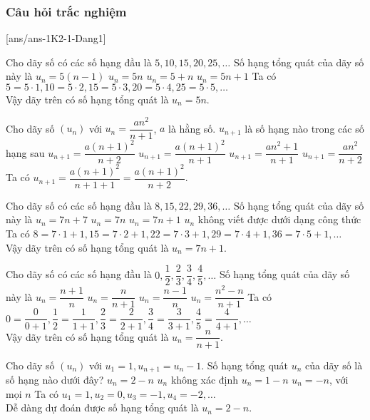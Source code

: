 \subsubsection{Câu hỏi trắc nghiệm}
[ans/ans-1K2-1-Dang1]
\begin{ex}%
	Cho dãy số có các số hạng đầu là $5,10,15,20,25, \ldots$ Số hạng tổng quát của dãy số này là
	\choice
	{$ u_n=5(n-1) $}
	{\True$ u_n=5n $}
	{$ u_n=5+n $}
	{$ u_n=5n+1 $}
	\loigiai
	{Ta có $5=5\cdot 1, 10=5 \cdot 2, 15 = 5\cdot 3, 20=5 \cdot 4, 25 = 5\cdot 5, \ldots$\\
		Vậy dãy trên có số hạng tổng quát là $u_n=5n$.
	}
\end{ex}
\begin{ex}%
	Cho dãy số $(u_n)$ với $u_n=\dfrac{an^2}{n+1}$, $a$ là hằng số. $u_{n+1}$ là số hạng nào trong các số hạng sau
	\choice
	{\True $u_{n+1}=\dfrac{a(n+1)^2}{n+2} $}
	{$u_{n+1}=\dfrac{a(n+1)^2}{n+1}$}
	{$u_{n+1}=\dfrac{an^2+1}{n+1}$}
	{$u_{n+1}=\dfrac{an^2}{n+2} $}
	\loigiai
	{Ta có $u_{n+1}=\dfrac{a(n+1)^2}{n+1+1}=\dfrac{a(n+1)^2}{n+2}$.
	}
\end{ex}
\begin{ex}%
	Cho dãy số có các số hạng đầu là $8,15,22,29,36, \ldots$ Số hạng tổng quát của dãy số này là
	\choice
	{$ u_n=7n+7 $}
	{$ u_n=7n $}
	{\True $ u_n=7n+1 $}
	{$ u_n$ không viết được dưới dạng công thức }
	\loigiai
	{Ta có $8=7\cdot 1+1, 15=7 \cdot 2+1, 22 = 7\cdot 3+1, 29=7 \cdot 4+1, 36 = 7\cdot 5+1, \ldots$\\
		Vậy dãy trên có số hạng tổng quát là $u_n=7n+1$.
	}
\end{ex}
\begin{ex}%
	Cho dãy số có các số hạng đầu là $0,\dfrac{1}{2},\dfrac{2}{3},\dfrac{3}{4},\dfrac{4}{5}, \ldots$ Số hạng tổng quát của dãy số này là
	\choice
	{$ u_n=\dfrac{n+1}{n}$}
	{\True $ u_n=\dfrac{n}{n+1} $}
	{$ u_n=\dfrac{n-1}{n}$}
	{$ u_n=\dfrac{n^2-n}{n+1}$  }
	\loigiai
	{Ta có $0=\dfrac{0}{0+1}, \dfrac{1}{2}=\dfrac{1}{1+1} ,\dfrac{2}{3} = \dfrac{2}{2+1}, \dfrac{3}{4}=\dfrac{3}{3+1}, \dfrac{4}{5} = \dfrac{4}{4+1}, \ldots$\\
		Vậy dãy trên có số hạng tổng quát là $u_n=\dfrac{n}{n+1}$.
	}
\end{ex}
\begin{ex}%
	Cho dãy số $(u_n)$ với $u_1=1, u_{n+1}=u_n-1$. Số hạng tổng quát $u_n$ của dãy số là số hạng nào dưới đây?
	\choice
	{\True $ u_n=2-n$}
	{$ u_n$ không xác định}
	{$ u_n=1-n$}
	{$ u_n=-n$, với mọi $n$ }
	\loigiai
	{Ta có $u_1=1, u_2=0 ,u_3 = -1, u_4=-2,  \ldots$\\
		Dễ dàng dự đoán được số hạng tổng quát là $u_n=2-n$.
	}
\end{ex}
